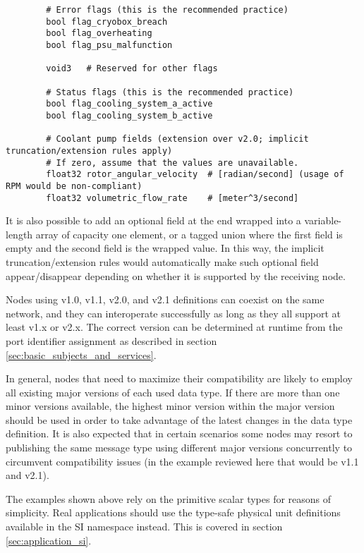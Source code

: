 \begin{remark}[breakable]
\begin{verbatim}
        # Error flags (this is the recommended practice)
        bool flag_cryobox_breach
        bool flag_overheating
        bool flag_psu_malfunction

        void3   # Reserved for other flags

        # Status flags (this is the recommended practice)
        bool flag_cooling_system_a_active
        bool flag_cooling_system_b_active

        # Coolant pump fields (extension over v2.0; implicit truncation/extension rules apply)
        # If zero, assume that the values are unavailable.
        float32 rotor_angular_velocity  # [radian/second] (usage of RPM would be non-compliant)
        float32 volumetric_flow_rate    # [meter^3/second]
    \end{verbatim}

    It is also possible to add an optional field at the end wrapped into a variable-length
    array of capacity one element, or a tagged union where the first field is empty
    and the second field is the wrapped value.
    In this way, the implicit truncation/extension rules would automatically make such optional field
    appear/disappear depending on whether it is supported by the receiving node.

    Nodes using v1.0, v1.1, v2.0, and v2.1 definitions can coexist on the same network,
    and they can interoperate successfully as long as they all support at least v1.x or v2.x.
    The correct version can be determined at runtime from the port identifier assignment as described in section
    \ref{sec:basic_subjects_and_services}.

    In general, nodes that need to maximize their compatibility are likely to employ all existing major versions of
    each used data type.
    If there are more than one minor versions available, the highest minor version within the major version should
    be used in order to take advantage of the latest changes in the data type definition.
    It is also expected that in certain scenarios some nodes may resort to publishing the same message type
    using different major versions concurrently to circumvent compatibility issues
    (in the example reviewed here that would be v1.1 and v2.1).

    The examples shown above rely on the primitive scalar types for reasons of simplicity.
    Real applications should use the type-safe physical unit definitions available in the SI namespace instead.
    This is covered in section \ref{sec:application_si}.
\end{remark}
